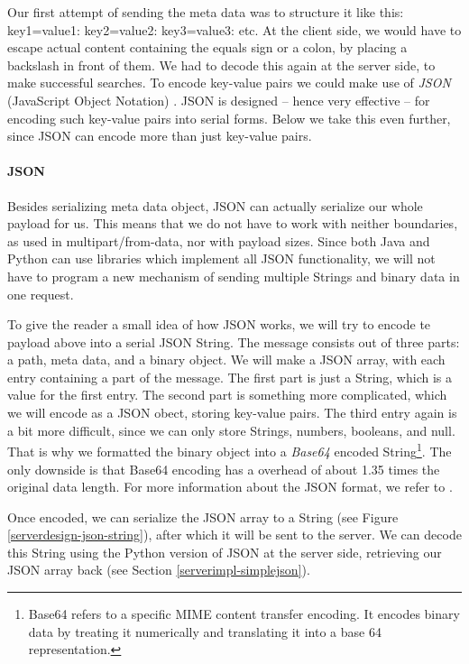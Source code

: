 Our first attempt of sending the meta data was to structure it like this:
key1=value1: key2=value2: key3=value3: etc. At the client side, we would have to
escape actual content containing the equals sign or a colon, by placing a
backslash in front of them. We had to decode this again at the server side, to
make successful searches. To encode key-value pairs we could make use of
\emph{JSON} (JavaScript Object Notation) \cite{json-www}. JSON is designed --
hence very effective -- for encoding such key-value pairs into serial forms.
Below we take this even further, since JSON can encode more than just
key-value pairs.

\paragraph{JSON}
\label{serverdesign-json}
Besides serializing meta data object, JSON can actually serialize our whole
payload for us. This means that we do not have to work with neither boundaries,
as used in multipart/from-data, nor with payload sizes. Since both Java and
Python can use libraries which implement all JSON functionality, we will not
have to program a new mechanism of sending multiple Strings and binary data
in one request. 

To give the reader a small idea of how JSON works, we will try to encode te
payload above into a serial JSON String. The message consists out of three parts:
a path, meta data, and a binary object. We will make a JSON array, with each
entry containing a part of the message. The first part is just a String, which
is a value for the first entry. The second part is something more complicated, which we will
encode as a JSON obect, storing key-value pairs. The third entry again is a bit
more difficult, since we can only store Strings, numbers, booleans, and null.
That is why we formatted the binary object into a \emph{Base64} encoded
String\footnote{Base64 refers to a specific MIME content transfer encoding. It
encodes binary data by treating it numerically and translating it into a base 64
representation.}. The only downside is that Base64 encoding has a overhead of
about 1.35 times the original data length. For more information about the JSON
format, we refer to \cite{json-www}.

Once encoded, we can serialize the JSON array to a String (see Figure
\ref{serverdesign-json-string}), after which it will be sent to the server. We
can decode this String using the Python version of JSON at the server side,
retrieving our JSON array back (see Section \ref{serverimpl-simplejson}).

